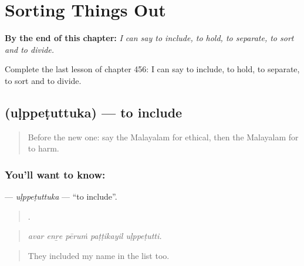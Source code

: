 
\chapter{Sorting Things Out}
\label{ch:ml-sorting-things-out}

\begin{chapteropening}
\textbf{By the end of this chapter:} \emph{I can say to include, to hold, to separate, to sort and to divide.}

Complete the last lesson of chapter 456: I can say to include, to hold, to separate, to sort and to divide.
\end{chapteropening}

\section[\texorpdfstring{\ml{ഉൾപ്പെടുത്തുക} (uḷppeṭuttuka)}{ഉൾപ്പെടുത്തുക (uḷppeṭuttuka)}]{ (uḷppeṭuttuka) — to include}

\label{lesson:ML-C456-ulppetuttuka}



\begin{quote}
Before the new one: say the Malayalam for ethical, then the Malayalam for to harm.
\end{quote}

\subsection*{You'll want to know: }
\textbf{} — \emph{uḷppeṭuttuka} — \textquotedblleft{}to include\textquotedblright{}.

\begin{quote}
    .
\end{quote}

\begin{quote}
\emph{avar enṟe pēruṁ paṭṭikayil uḷppeṭutti.}
\end{quote}

\begin{quote}
They included my name in the list too.
\end{quote}

